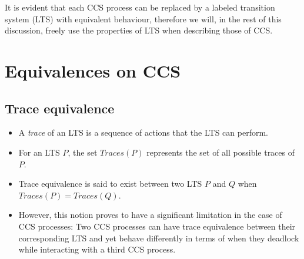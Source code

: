 \documentclass{article}
\begin{document}
It is evident that each CCS process can be replaced by a labeled
transition system (LTS) with equivalent behaviour, therefore we will,
in the rest of this discussion, freely use the properties of LTS when
describing those of CCS.

\section{Equivalences on CCS}

\subsection{Trace equivalence}
  \begin{itemize}

  \item A \emph{trace} of an LTS is a sequence of actions
    that the LTS can perform.

  \item For an LTS $P$, the set $Traces(P)$ represents the set of all
    possible traces of $P$.
  \item Trace equivalence is said to exist between two LTS $P$ and $Q$
    when $Traces(P) = Traces(Q)$.
  \item However, this notion proves to have a significant limitation
    in the case of CCS processes: Two CCS processes can have trace equivalence
    between their corresponding LTS and yet behave differently in
    terms of when they deadlock while interacting with a third CCS process.
  \end{itemize}
\end{document}
